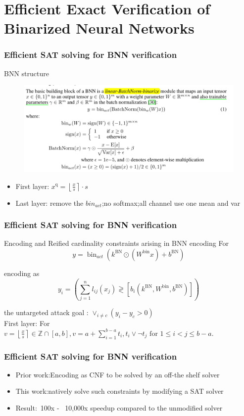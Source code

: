 \documentclass[aspectratio=169%
,serif,mathserif]{beamer}
\begin{document}
\section{Efficient Exact Verification of Binarized Neural Networks}
\begin{frame}
	\frametitle{Efficient SAT solving for BNN verification}
	BNN structure
	\begin{figure}
		\includegraphics[width=0.7\linewidth]{1.png}
	\end{figure}
	\begin{itemize}
		\item First layer: $x^{\mathrm{q}}=\left\lfloor\frac{x}{s}\right\rceil \cdot s$
		\item Last layer: remove the $bin_{act}$;no softmax;all channel use one mean and var		
	\end{itemize}
\end{frame}

\begin{frame}
	\frametitle{Efficient SAT solving for BNN verification}
	Encoding and Reified cardinality constraints arising in BNN encoding
	For
	$$
	y=\operatorname{bin}_{a c t}\left(k^{\mathrm{BN}} \odot\left(W^{\mathrm{bin}} x\right)+b^{\mathrm{BN}}\right)
	$$
	
	encoding as
	$$
	y_{i}=\left(\sum_{j=1}^{n} l_{i j}\left(x_{j}\right) \gtrless\left[b_{i}\left(k^{\mathrm{BN}}, W^{\mathrm{bin}}, b^{\mathrm{BN}}\right)\right]\right)
	$$

	the untargeted attack goal : $\vee_{i \neq c}\left(y_{i}-y_{c}>0\right)$ \\
	First layer: For $v=\left\lfloor\frac{x}{s}\right\rceil \in \mathbb{Z} \cap[a, b],v=a+\sum_{i=1}^{b-a} t_{i},t_{i} \vee \neg t_{j} \text { for } 1 \leq i<j \leq b-a .$

\end{frame}

\begin{frame}
	\frametitle{Efficient SAT solving for BNN verification}
	\begin{itemize}
		\item Prior work:Encoding as CNF to be solved by an off-the shelf solver
		\item This work:natively solve such constraints by modifying a SAT solver
		\item Result:~100x - ~10,000x speedup compared to the unmodified solver
	\end{itemize}

\end{frame}
\end{document}
